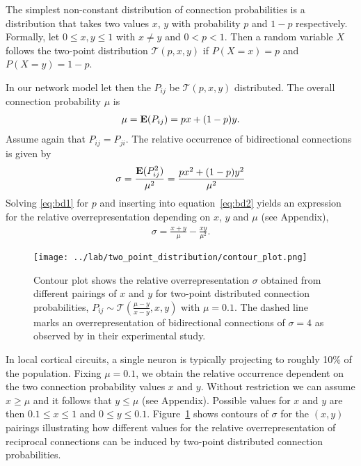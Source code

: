 
The simplest non-constant distribution of connection probabilities is a distribution that takes two values $x$, $y$ with probability $p$ and $1-p$ respectively. Formally, let $0 \leq x,y \leq 1$ with $x \neq y$  and $0 < p < 1$. Then a random variable $X$ follows the two-point distribution %
$\mathcal{T}(p,x,y)$ if $P(X=x)=p$ and $P(X=y) = 1-p$. 

In our network model let then the $P_{ij}$ be $\mathcal{T}(p,x,y)$ distributed. The overall connection probability $\mu$ is
\begin{align}
\mu = \operatorname{\mathbf{E}}(P_{ij}) = px + (1-p)y. \label{eq:bd1}
\end{align}
Assume again that $P_{ij} = P_{ji}$. The relative occurrence of bidirectional connections is given by
\begin{align}
  \sigma = \frac{\operatorname{\mathbf{E}}(P_{ij}^2)}{\mu^2} = \frac{p x^2 + (1-p) y^2}{\mu^2} \label{eq:bd2}
\end{align}
Solving \eqref{eq:bd1} for $p$ and inserting into equation~\eqref{eq:bd2} yields an expression for the relative overrepresentation depending on $x$, $y$ and $\mu$ (see Appendix),
\begin{align}
\sigma = \frac{x+y}{\mu} - \frac{xy}{\mu^2}.
\end{align}

\begin{figure}[h!]
\centering
\texttt{[image: ../lab/two\_point\_distribution/contour\_plot.png]}
\caption{Contour plot shows the relative overrepresentation $\sigma$ obtained from different pairings of $x$ and $y$ for two-point distributed connection probabilities, $P_{ij} \sim \mathcal{T}(\frac{\mu-y}{x-y},x,y)$ with $\mu = 0.1$. The dashed line marks an overrepresentation of bidirectional connections of $\sigma=4$ as observed by \textcite{Song2005} in their experimental study.}
\label{fig:tp}
\end{figure}

In local cortical circuits, a single neuron is typically projecting to roughly 10\% of the population. Fixing $\mu = 0.1$, we obtain the relative occurrence dependent on the two connection probability values $x$ and $y$. Without restriction we can assume $x \geq \mu$ and it follows that $y \leq \mu$ (see Appendix). Possible values for $x$ and $y$ are then $0.1 \leq x \leq 1$ and $0 \leq y \leq 0.1$. Figure~\ref{fig:tp} shows contours of $\sigma$ for the $(x,y)$ pairings illustrating how different values for the relative overrepresentation of reciprocal connections can be induced by two-point distributed connection probabilities.  





